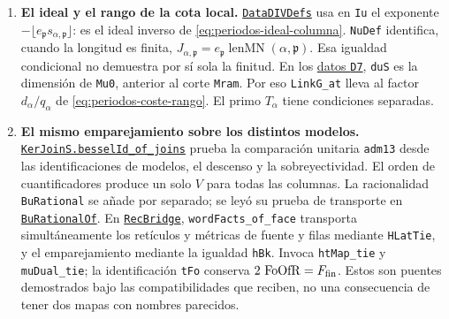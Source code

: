 \begin{enumerate}
\item \textbf{El ideal y el rango de la cota local.}
\href{https://github.com/CocoSgt/riemann-hypothesis-lean/blob/7cbf7a0c32fca1badf05931879a37c3f8a2b03b4/src/Formalism/LocalRingCardinality/DataDIVDefs.lean}{\texttt{DataDIVDefs}}
usa en \texttt{Iu} el exponente
$-\lfloor e_\mathfrak p s_{\alpha,\mathfrak p}\rfloor$:
es el ideal inverso de \eqref{eq:periodos-ideal-columna}.
\texttt{NuDef} identifica, cuando la longitud es finita,
$J_{\alpha,\mathfrak p}=e_\mathfrak p
\operatorname{lenMN}(\alpha,\mathfrak p)$.
Esa igualdad condicional no demuestra por sí sola la finitud.
En los
\href{https://github.com/CocoSgt/riemann-hypothesis-lean/blob/7cbf7a0c32fca1badf05931879a37c3f8a2b03b4/src/Formalism/LocalRingCardinality/RhoDetPrimeEqMuTildeMulChiPow.lean}{datos \texttt{D7}},
\texttt{duS} es la dimensión de \texttt{Mu0}, anterior al corte
\texttt{Mram}. Por eso \texttt{LinkG\_at} lleva al factor
$d_\alpha/q_\alpha$ de \eqref{eq:periodos-coste-rango}.
El primo $T_\alpha$ tiene condiciones separadas.

\item \textbf{El mismo emparejamiento sobre los distintos modelos.}
\href{https://github.com/CocoSgt/riemann-hypothesis-lean/blob/7cbf7a0c32fca1badf05931879a37c3f8a2b03b4/src/Formalism/LocalToGlobal/SiegelLatticeTheory/FlagStabilizerTensors/KerJoinS.lean}{\texttt{KerJoinS.besselId\_of\_joins}}
prueba la comparación unitaria \texttt{adm13} desde las
identificaciones de modelos, el descenso y la sobreyectividad.
El orden de cuantificadores produce un solo $V$ para todas las
columnas. La racionalidad \texttt{BuRational} se añade por separado;
se leyó su prueba de transporte en
\href{https://github.com/CocoSgt/riemann-hypothesis-lean/blob/7cbf7a0c32fca1badf05931879a37c3f8a2b03b4/src/Formalism/LocalToGlobal/Divisibility/DivisibilityRemainder/RationalColumns/BuRationalOf.lean}{\texttt{BuRationalOf}}.
En
\href{https://github.com/CocoSgt/riemann-hypothesis-lean/blob/7cbf7a0c32fca1badf05931879a37c3f8a2b03b4/src/Formalism/LocalToGlobal/Divisibility/RecBridge.lean}{\texttt{RecBridge}},
\texttt{wordFacts\_of\_face} transporta simultáneamente los
retículos y métricas de fuente y filas mediante \texttt{HLatTie},
y el emparejamiento mediante la igualdad \texttt{hBk}.
Invoca \texttt{htMap\_tie} y \texttt{muDual\_tie};
la identificación \texttt{tFo} conserva
$2\,\operatorname{FoOfR}=F_{\rm fin}$.
Estos son puentes demostrados bajo las compatibilidades que reciben,
no una consecuencia de tener dos mapas con nombres parecidos.


\end{enumerate}

